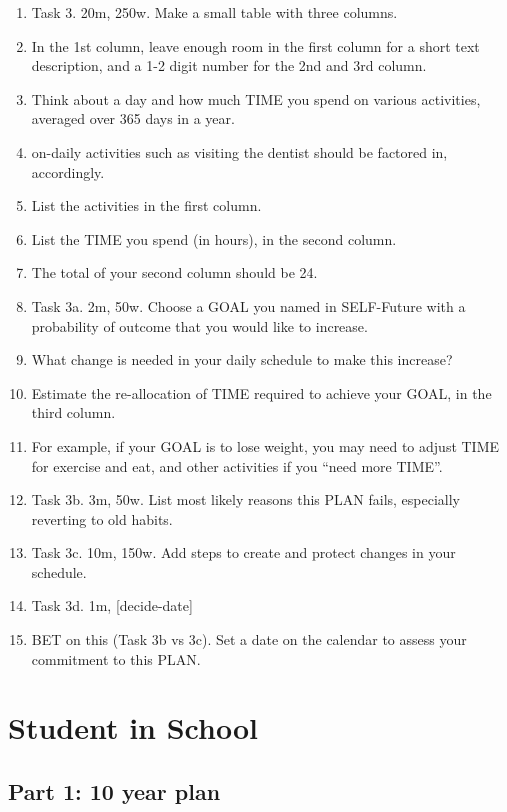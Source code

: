 \documentclass[
]{book}
\providecommand{\tightlist}{%
  \setlength{\itemsep}{0pt}\setlength{\parskip}{0pt}}
\begin{document}
\begin{enumerate}
\def\labelenumi{\arabic{enumi}.}
\setcounter{enumi}{77}
\tightlist
\item
  Task 3. 20m, 250w. Make a small table with three columns.
\item
  In the 1st column, leave enough room in the first column for a short text
  description, and a 1-2 digit number for the 2nd and 3rd column.
\item
  Think about a day and how much TIME you spend on various activities, averaged
  over 365 days in a year.
\item
  on-daily activities such as visiting the dentist should be factored in, accordingly.
\item
  List the activities in the first column.
\item
  List the TIME you spend (in hours), in the second column.
\item
  The total of your second column should be 24.
\item
  Task 3a. 2m, 50w. Choose a GOAL you named in SELF-Future with a probability
  of outcome that you would like to increase.
\item
  What change is needed in your daily schedule to make this increase?
\item
  Estimate the re-allocation of TIME required to achieve your GOAL, in the third
  column.
\item
  For example, if your GOAL is to lose weight, you may need to adjust TIME for
  exercise and eat, and other activities if you ``need more TIME''.
\item
  Task 3b. 3m, 50w. List most likely reasons this PLAN fails, especially reverting to
  old habits.
\item
  Task 3c. 10m, 150w. Add steps to create and protect changes in your schedule.
\item
  Task 3d. 1m, {[}decide-date{]}
\item
  BET on this (Task 3b vs 3c). Set a date on the calendar to assess your
  commitment to this PLAN.
\end{enumerate}

\chapter{Student in School}\label{student-in-school}

\section{Part 1: 10 year plan}\label{part-1-10-year-plan}
\end{document}
